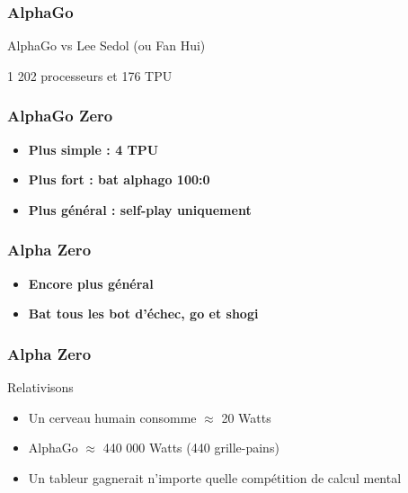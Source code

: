 \begin{frame}
  \frametitle{AlphaGo}
  \begin{center}
    AlphaGo vs Lee Sedol (ou Fan Hui)
  \end{center}
  \huge
  1 202 processeurs et 176 TPU
\end{frame}

\begin{frame}
  \frametitle{AlphaGo Zero}
  \begin{itemize}
  \item \textbf{Plus simple : 4 TPU}
  \item \textbf{Plus fort : bat alphago 100:0}
  \item \textbf{Plus général : self-play uniquement}
  \end{itemize}  
\end{frame}

\begin{frame}
  \frametitle{Alpha Zero}
  \begin{itemize}
  \item \textbf{Encore plus général}
  \item \textbf{Bat tous les bot d'échec, go et shogi}
  \end{itemize}  
\end{frame}

\begin{frame}
  \frametitle{Alpha Zero}
  Relativisons
  \begin{itemize}
  \item Un cerveau humain consomme $\approx$ 20 Watts
  \item AlphaGo $\approx$ 440 000 Watts (440 grille-pains)
  \item Un tableur gagnerait n'importe quelle compétition de calcul mental
  \end{itemize}
\end{frame}

